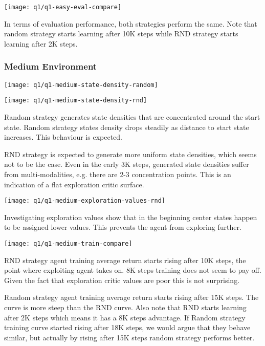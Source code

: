 \documentclass[11pt]{article}
\begin{document}
    \hspace*{-0.6in}
    \texttt{[image: q1/q1-easy-eval-compare]}

    In terms of evaluation performance, both strategies perform the same.
    Note that random strategy starts learning after 10K steps while RND strategy starts learning after 2K steps.

    \subsubsection*{Medium Environment}

    \hspace*{-0.6in}
    \texttt{[image: q1/q1-medium-state-density-random]}

    \hspace*{-0.6in}
    \texttt{[image: q1/q1-medium-state-density-rnd]}

    Random strategy generates state densities that are concentrated around the start state.
    Random strategy states density drops steadily as distance to start state increases.
    This behaviour is expected.

    RND strategy is expected to generate more uniform state densities, which seems not to be the case.
    Even in the early 3K steps, generated state densities suffer from multi-modalities, e.g. there are 2-3 concentration points.
    This is an indication of a flat exploration critic surface.

    \hspace*{-0.6in}
    \texttt{[image: q1/q1-medium-exploration-values-rnd]}

    Investigating exploration values show that in the beginning center states happen to be assigned lower values.
    This prevents the agent from exploring further.

    \hspace*{-0.6in}
    \texttt{[image: q1/q1-medium-train-compare]}

    RND strategy agent training average return starts rising after 10K steps, the point where exploiting agent takes on.
    8K steps training does not seem to pay off.
    Given the fact that exploration critic values are poor this is not surprising.

    Random strategy agent training average return starts rising after 15K steps.
    The curve is more steep than the RND curve.
    Also note that RND starts learning after 2K steps which means it has a 8K steps advantage.
    If Random strategy training curve started rising after 18K steps, we would argue that they behave similar, but actually by rising after 15K steps random strategy performs better.
\end{document}
